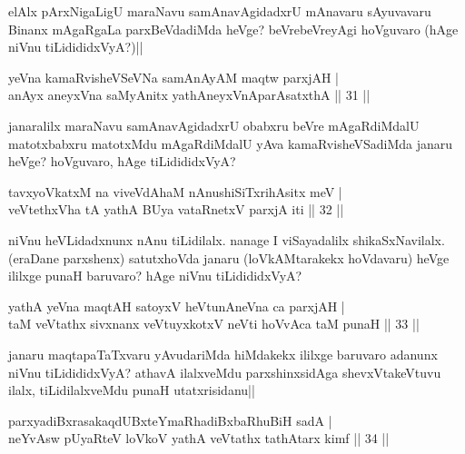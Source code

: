 \begin{artha}
elAlx pArxNigaLigU maraNavu samAnavAgidadxrU mAnavaru sAyuvavaru 
Binanx mAgaRgaLa parxBeVdadiMda heVge? beVrebeVreyAgi hoVguvaro (hAge 
niVnu tiLidididxVyA?)||
\end{artha}


\begin{shl}
yeVna kamaRvisheVSeVNa samAnAyAM maqtw parxjAH | \\
anAyx aneyxVna saMyAnitx yathA\s neyxVnAparAsatxthA \hfill|| 31 || 
\end{shl}

\begin{artha}
janaralilx maraNavu samAnavAgidadxrU obabxru beVre mAgaRdiMdalU 
matotxbabxru matotxMdu mAgaRdiMdalU yAva kamaRvisheVSadiMda janaru 
heVge? hoVguvaro, hAge tiLidididxVyA?
\end{artha}


\begin{shl}
tavxyoVkatxM na viveVdAhaM nAnushiSiTxrihAsitx meV | \\
veVtethxVha tA yathA BUya vataRnetxV parxjA iti  \hfill|| 32 || 
\end{shl}

\begin{artha}
niVnu heVLidadxnunx nAnu tiLidilalx. nanage I viSayadalilx 
shikaSxNavilalx. (eraDane parxshenx) satutxhoVda janaru 
(loVkAMtarakekx hoVdavaru) heVge ililxge punaH baruvaro? hAge niVnu 
tiLidididxVyA? 
\end{artha}


\begin{shl}
yathA yeVna maqtAH satoyxV heVtunA\s neVna ca parxjAH | \\
taM veVtathx sivxnanx veVtuyxkotxV neVti hoVvAca taM punaH \hfill|| 33 || 
\end{shl}

\begin{artha}
janaru maqtapaTaTxvaru yAvudariMda hiMdakekx ililxge baruvaro adanunx 
niVnu tiLidididxVyA? athavA ilalxveMdu parxshinxsidAga shevxVtakeVtuvu 
ilalx, tiLidilalxveMdu punaH utatxrisidanu||
\end{artha}


\begin{shl}
parxyadiBxrasakaqdUBxteYmaRhadiBxbaRhuBiH sadA | \\
neYvAsw pUyaRteV loVkoV yathA veVtathx tathA\s tarx kimf \hfill|| 34 || 
\end{shl}

